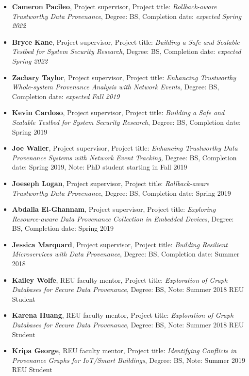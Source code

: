 \begin{itemize}
\tightlist
\item \textbf{Cameron Pacileo}, Project supervisor, Project title: \textit{Rollback-aware Trustworthy Data Provenance}, Degree: BS, Completion date: \textit{expected Spring 2022}
\item \textbf{Bryce Kane}, Project supervisor, Project title: \textit{Building a Safe and Scalable Testbed for System Security Research}, Degree: BS, Completion date: \textit{expected Spring 2022}
\item \textbf{Zachary Taylor}, Project supervisor, Project title: \textit{Enhancing Trustworthy Whole-system Provenance Analysis with Network Events}, Degree: BS, Completion date: \textit{expected Fall 2019}
\item \textbf{Kevin Cardoso}, Project supervisor, Project title: \textit{Building a Safe and Scalable Testbed for System Security Research}, Degree: BS, Completion date: Spring 2019
\item \textbf{Joe Waller}, Project supervisor, Project title: \textit{Enhancing Trustworthy Data Provenance Systems with Network Event Tracking}, Degree: BS, Completion date: Spring 2019, Note: PhD student starting in Fall 2019
\item \textbf{Joeseph Logan}, Project supervisor, Project title: \textit{Rollback-aware Trustworthy Data Provenance}, Degree: BS, Completion date: Spring 2019
\item \textbf{Abdalla El-Ghannam}, Project supervisor, Project title: \textit{Exploring Resource-aware Data Provenance Collection in Embedded Devices}, Degree: BS, Completion date: Spring 2019
\item \textbf{Jessica Marquard}, Project supervisor, Project title: \textit{Building Resilient Microservices with Data Provenance}, Degree: BS, Completion date: Summer 2018

\item \textbf{Kailey Wolfe}, REU faculty mentor, Project title: \textit{Exploration of Graph Databases for Secure Data Provenance}, Degree: BS, Note: Summer 2018 REU Student
\item \textbf{Karena Huang}, REU faculty mentor, Project title: \textit{Exploration of Graph Databases for Secure Data Provenance}, Degree: BS, Note: Summer 2018 REU Student
\item \textbf{Kripa George}, REU faculty mentor, Project title: \textit{Identifying Conflicts in Provenance Graphs for IoT/Smart Buildings}, Degree: BS, Note: Summer 2019 REU Student
\end{itemize}

